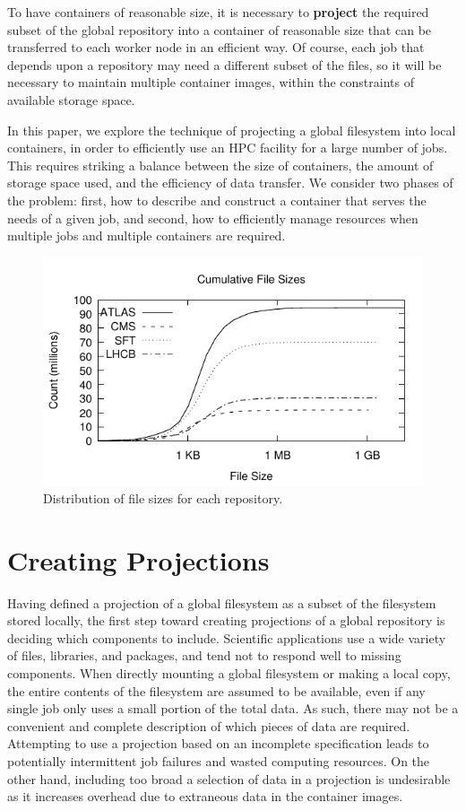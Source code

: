 \documentclass[sigconf]{acmart}
\begin{document}
To have containers of reasonable size, it is necessary to {\bf project}
the required subset of the global repository into a container of reasonable size that can be transferred to each worker node in an
efficient way. Of course, each job that depends upon a repository may need a different subset of the files, so it will be necessary to
maintain multiple container images, within the constraints of available 
storage space.

In this paper, we explore the technique of projecting a global
filesystem into local containers, in order to efficiently use
an HPC facility for a large number of jobs.  This requires striking
a balance between the size of containers, the amount of storage
space used, and the efficiency of data transfer.
We consider two phases of the problem: first, how to describe
and construct a container that serves the needs of a given job,
and second, how to efficiently manage resources when multiple
jobs and multiple containers are required.


\begin{figure}[h]
\includegraphics[width=\linewidth]{curated/cdf/cdf.pdf}
\caption{Distribution of file sizes for each repository.}
\label{fig:cdf}
\end{figure}


\section{Creating Projections}

Having defined a projection of a global filesystem as a subset of the filesystem stored locally,
the first step toward creating projections of a global repository is deciding which components to include.
Scientific applications use a wide variety of files, libraries, and packages,
and tend not to respond well to missing components.
When directly mounting a global filesystem or making a local copy,
the entire contents of the filesystem are assumed to be available,
even if any single job only uses a small portion of the total data.
As such, there may not be a convenient and complete description of which pieces of data are required.
Attempting to use a projection based on an incomplete specification leads to potentially intermittent job failures and wasted computing resources.
On the other hand,
including too broad a selection of data in a projection is undesirable as it increases overhead due to extraneous data in the container images.
\end{document}
